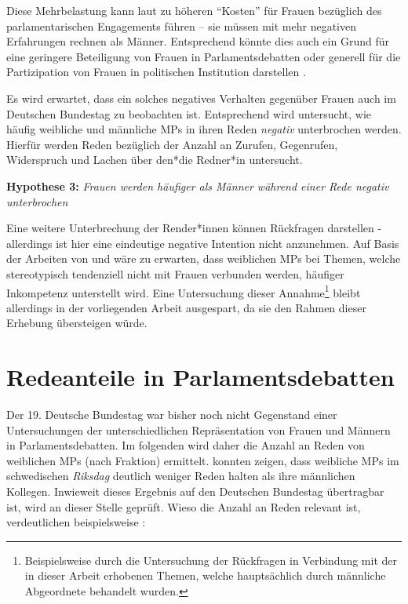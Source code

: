 \documentclass[12pt, 
    twoside=false, 
    bibliography=totoc, 
    numbers=endperiod, 
    headings=normal, 
    toc=chapterentrydotfill
    ]{scrbook}
\begin{document}
Diese Mehrbelastung kann laut \textcite{erikson_2018} zu höheren \enquote{Kosten} für Frauen bezüglich des parlamentarischen Engagements führen -- sie müssen mit mehr negativen Erfahrungen rechnen als Männer. Entsprechend könnte dies auch ein Grund für eine geringere Beteiligung von Frauen in Parlamentsdebatten oder generell für die Partizipation von Frauen in politischen Institution darstellen \parencites[vgl.][]{erikson_2018}[vgl.][]{back_2014}.

Es wird erwartet, dass ein solches negatives Verhalten gegenüber Frauen auch im Deutschen Bundestag zu beobachten ist. Entsprechend wird untersucht, wie häufig weibliche und männliche MPs in ihren Reden \emph{negativ} unterbrochen werden. Hierfür werden Reden bezüglich der Anzahl an Zurufen, Gegenrufen, Widerspruch und Lachen über den*die Redner*in untersucht.

\textbf{Hypothese 3:} \emph{Frauen werden häufiger als Männer während einer Rede negativ unterbrochen}

Eine weitere Unterbrechung der Render*innen können Rückfragen darstellen - allerdings ist hier eine eindeutige negative Intention nicht anzunehmen. Auf Basis der Arbeiten von \textcite{brescoll_2011} und \textcite{eagly_2002} wäre zu erwarten, dass weiblichen MPs bei Themen, welche stereotypisch tendenziell nicht mit Frauen verbunden werden, häufiger Inkompetenz unterstellt wird. Eine Untersuchung dieser Annahme\footnote{Beispielsweise durch die Untersuchung der Rückfragen in Verbindung mit der in dieser Arbeit erhobenen Themen, welche hauptsächlich durch männliche Abgeordnete behandelt wurden.} bleibt allerdings in der vorliegenden Arbeit ausgespart, da sie den Rahmen dieser Erhebung übersteigen würde.


\section{Redeanteile in Parlamentsdebatten}\label{kap:redenanteile}

Der 19. Deutsche Bundestag war bisher noch nicht Gegenstand einer Untersuchungen der unterschiedlichen Repräsentation von Frauen und Männern in Parlamentsdebatten. Im folgenden wird daher die Anzahl an Reden von weiblichen MPs (nach Fraktion) ermittelt. \textcite{back_2014} konnten zeigen, dass weibliche MPs im schwedischen \emph{Riksdag} deutlich weniger Reden halten als ihre männlichen Kollegen. Inwieweit dieses Ergebnis auf den Deutschen Bundestag übertragbar ist, wird an dieser Stelle geprüft. Wieso die Anzahl an Reden relevant ist, verdeutlichen beispielsweise \textcite{back_2014}:
\end{document}
